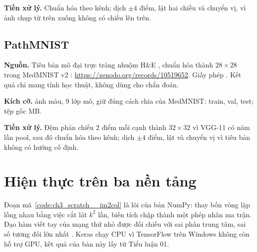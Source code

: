 \textbf{Tiền xử lý.} Chuẩn hóa theo kênh; dịch $\pm4$ điểm, lật hai chiều và chuyển vị, vì ảnh chụp từ trên xuống không có chiều lên trên.

\subsection{PathMNIST}
\textbf{Nguồn.} Tiêu bản mô đại trực tràng nhuộm H\&E \cite{ch3-kather2019}, chuẩn hóa thành $28{\times}28$ trong MedMNIST v2 \cite{ch3-yang2023}: \url{https://zenodo.org/records/10519652}. Giấy phép . Kết quả chỉ mang tính học thuật, không dùng cho chẩn đoán.

\textbf{Kích cỡ.}  ảnh màu, 9 lớp mô, giữ đúng cách chia của MedMNIST:  train,  val,  test; tệp gốc  MB.



\textbf{Tiền xử lý.} Đệm phản chiếu 2 điểm mỗi cạnh thành $32{\times}32$ vì VGG-11 có năm lần pool, sau đó chuẩn hóa theo kênh; dịch $\pm4$ điểm, lật và chuyển vị vì tiêu bản không có hướng cố định.

\section{Hiện thực trên ba nền tảng}
Đoạn mã~\ref{code:ch3_scratch__im2col} là lõi của bản NumPy: thay bốn vòng lặp lồng nhau bằng việc cắt lát $k^2$ lần, biến tích chập thành một phép nhân ma trận. Đạo hàm viết tay của mạng thử nhỏ được đối chiếu với sai phân trung tâm, sai số tương đối lớn nhất . Keras chạy CPU vì TensorFlow trên Windows không còn hỗ trợ GPU, kết quả của bản này lấy từ Tiểu luận 01.



